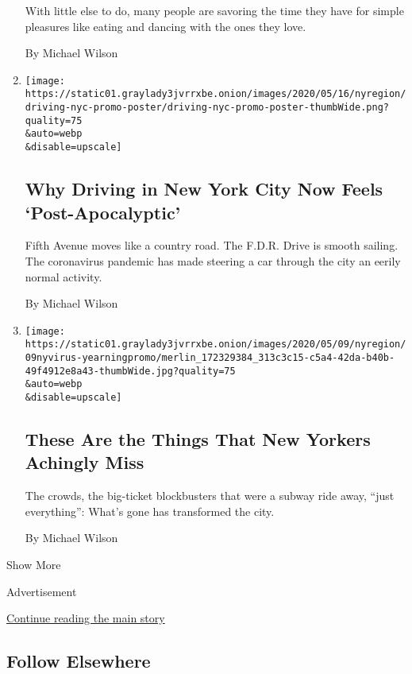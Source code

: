 \begin{enumerate}
  With little else to do, many people are savoring the time they have
  for simple pleasures like eating and dancing with the ones they love.

  By Michael Wilson
\item
  \href{/2020/05/17/nyregion/coronavirus-nyc-driving-traffic.html}{}

  \texttt{[image: https://static01.graylady3jvrrxbe.onion/images/2020/05/16/nyregion/driving-nyc-promo-poster/driving-nyc-promo-poster-thumbWide.png?quality=75\\\&auto=webp\\\&disable=upscale]}

  \hypertarget{why-driving-in-new-york-city-now-feels-post-apocalyptic}{%
  \subsection{Why Driving in New York City Now Feels
  `Post-Apocalyptic'}\label{why-driving-in-new-york-city-now-feels-post-apocalyptic}}

  Fifth Avenue moves like a country road. The F.D.R. Drive is smooth
  sailing. The coronavirus pandemic has made steering a car through the
  city an eerily normal activity.

  By Michael Wilson
\item
  \href{/2020/05/09/nyregion/new-yorkers-missing-nyc-coronavirus.html}{}

  \texttt{[image: https://static01.graylady3jvrrxbe.onion/images/2020/05/09/nyregion/09nyvirus-yearningpromo/merlin\_172329384\_313c3c15-c5a4-42da-b40b-49f4912e8a43-thumbWide.jpg?quality=75\\\&auto=webp\\\&disable=upscale]}

  \hypertarget{these-are-the-things-that-new-yorkers-achingly-miss}{%
  \subsection{These Are the Things That New Yorkers Achingly
  Miss}\label{these-are-the-things-that-new-yorkers-achingly-miss}}

  The crowds, the big-ticket blockbusters that were a subway ride away,
  ``just everything'': What's gone has transformed the city.

  By Michael Wilson
\end{enumerate}

Show More

Advertisement

\protect\hyperlink{after-mid2}{Continue reading the main story}

\hypertarget{follow-elsewhere}{%
\subsection{Follow Elsewhere}\label{follow-elsewhere}}

